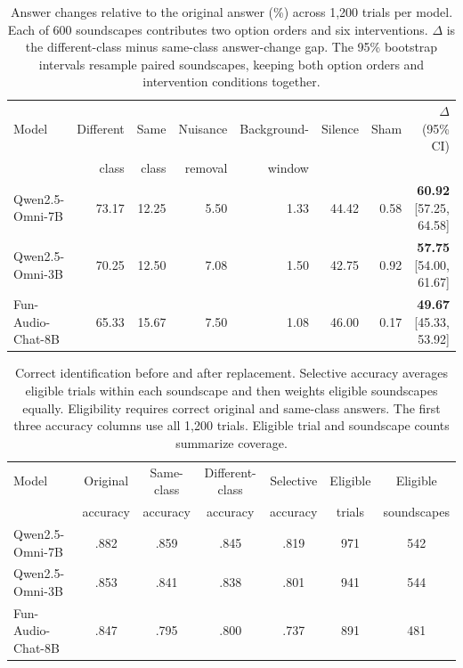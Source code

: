 \documentclass{article}
\begin{document}
\begin{table}[t]
\centering
\caption{Answer changes relative to the original answer (\%) across 1,200
trials per model. Each of 600 soundscapes contributes two option orders and six
interventions. $\Delta$ is the different-class minus same-class answer-change
gap. The 95\% bootstrap intervals resample paired soundscapes, keeping both
option orders and intervention conditions together.}
\label{tab:conditions}
\begin{tabular}{lrrrrrrr}
\hline
Model & Different & Same & Nuisance & Background- & Silence & Sham &
$\Delta$ (95\% CI) \\
 & class & class & removal & window & & & \\
\hline
Qwen2.5-Omni-7B & 73.17 & 12.25 & 5.50 & 1.33 & 44.42 & 0.58 &
\textbf{60.92} [57.25, 64.58] \\
Qwen2.5-Omni-3B & 70.25 & 12.50 & 7.08 & 1.50 & 42.75 & 0.92 &
\textbf{57.75} [54.00, 61.67] \\
Fun-Audio-Chat-8B & 65.33 & 15.67 & 7.50 & 1.08 & 46.00 & 0.17 &
\textbf{49.67} [45.33, 53.92] \\
\hline
\end{tabular}
\end{table}



\begin{table}[t]
\centering
\caption{Correct identification before and after replacement. Selective
accuracy averages eligible trials within each soundscape and then weights
eligible soundscapes equally. Eligibility requires correct original and
same-class answers. The first three accuracy columns use all 1,200 trials.
Eligible trial and soundscape counts summarize coverage.}
\label{tab:follow}
\setlength{\tabcolsep}{6pt}
\begin{tabular}{lcccccc}
\hline
Model & Original & Same-class & Different-class & Selective & Eligible &
Eligible \\
 & accuracy & accuracy & accuracy & accuracy & trials & soundscapes \\
\hline
Qwen2.5-Omni-7B~\cite{qwen25omni2025} & .882 & .859 & .845 & .819 & 971 & 542 \\
Qwen2.5-Omni-3B~\cite{qwen25omni2025} & .853 & .841 & .838 & .801 & 941 & 544 \\
Fun-Audio-Chat-8B~\cite{funaudiochat2026} & .847 & .795 & .800 & .737 & 891 & 481 \\
\hline
\end{tabular}
\end{table}
\end{document}
